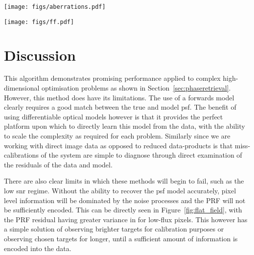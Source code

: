 \documentclass[]{spieman}
\begin{document}
\begin{figure*}
    \centering
    \texttt{[image: figs/aberrations.pdf]}
    \caption{Recovery of the optical aberrations after optimisation. Left: the amplitudes of the Zernike polynomial coefficients, with the top section showing the correlation plot of the true and recovered values, and the bottom showing the individual residuals. Middle and right: the true total \ac{opd} and the residuals generated by these values respectively.}
    \label{fig:aberrations}
\end{figure*}

\begin{figure*}
    \centering
    \texttt{[image: figs/ff.pdf]}
    \caption{This figure shows the PRF values after optimisation. The left panel shows the correlation between the pixel-level true and recovered values. Each ploint is color-coded with the total flux incident to each pixel, ie its \ac{snr}. The pixels with a greater signal are recovered better as expected. The right panel shows the histogram of these residuals, with the majority of values being very well recovered and small symmetric about a residual of zero.}
    \label{fig:flat_field}
\end{figure*}

\section{Discussion}

This algorithm demonstrates promising performance applied to complex high-dimensional optimisation problems as shown in Section~\ref{sec:phaseretrieval}. However, this method does have its limitations. The use of a forwards model clearly requires a good match between the true and model \ac{psf}. The benefit of using differentiable optical models however is that it provides the perfect platform upon which to directly learn this model from the data, with the ability to scale the complexity as required for each problem. Similarly since we are working with direct image data as opposed to reduced data-products is that miss-calibrations of the system are simple to diagnose through direct examination of the residuals of the data and model.

There are also clear limits in which these methods will begin to fail, such as the low \ac{snr} regime. Without the ability to recover the \ac{psf} model accurately, pixel level information will be dominated by the noise processes and the PRF will not be sufficiently encoded. This can be directly seen in Figure~\ref{fig:flat_field}, with the PRF residual having greater variance in for low-flux pixels. This however has a simple solution of observing brighter targets for calibration purposes or observing chosen targets for longer, until a sufficient amount of information is encoded into the data.
\end{document}
